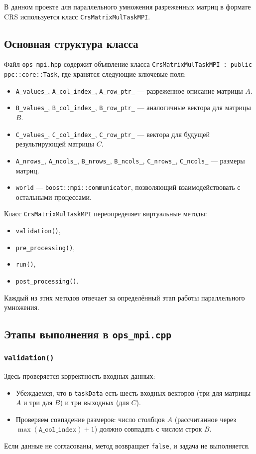 \documentclass[12pt]{article}
\begin{document}
В данном проекте для параллельного умножения разреженных матриц в формате CRS используется класс 
\texttt{CrsMatrixMulTaskMPI}.

\subsection{Основная структура класса}

Файл \texttt{ops\_mpi.hpp} содержит объявление класса 
\texttt{CrsMatrixMulTaskMPI : public ppc::core::Task}, где хранятся следующие ключевые поля:
\begin{itemize}
    \item \texttt{A\_values\_}, \texttt{A\_col\_index\_}, \texttt{A\_row\_ptr\_} --- разреженное описание матрицы \(A\).
    \item \texttt{B\_values\_}, \texttt{B\_col\_index\_}, \texttt{B\_row\_ptr\_} --- аналогичные вектора для матрицы \(B\).
    \item \texttt{C\_values\_}, \texttt{C\_col\_index\_}, \texttt{C\_row\_ptr\_} --- вектора для будущей результирующей матрицы \(C\).
    \item \texttt{A\_nrows\_}, \texttt{A\_ncols\_}, \texttt{B\_nrows\_}, \texttt{B\_ncols\_}, \texttt{C\_nrows\_}, \texttt{C\_ncols\_} --- размеры матриц.
    \item \texttt{world} --- \texttt{boost::mpi::communicator}, позволяющий взаимодействовать с остальными процессами.
\end{itemize}

Класс \texttt{CrsMatrixMulTaskMPI} переопределяет виртуальные методы:
\begin{itemize}
    \item \texttt{validation()},
    \item \texttt{pre\_processing()},
    \item \texttt{run()},
    \item \texttt{post\_processing()}.
\end{itemize}
Каждый из этих методов отвечает за определённый этап работы параллельного умножения.

\subsection{Этапы выполнения в \texttt{ops\_mpi.cpp}}

\subsubsection{\texttt{validation()}}
Здесь проверяется корректность входных данных:
\begin{itemize}
    \item Убеждаемся, что в \texttt{taskData} есть шесть входных векторов (три для матрицы \(A\) и три для \(B\)) и три выходных (для \(C\)).
    \item Проверяем совпадение размеров: число столбцов \(A\) (рассчитанное через \(\max(\texttt{A\_col\_index}) + 1\)) должно совпадать с числом строк \(B\).
\end{itemize}
Если данные не согласованы, метод возвращает \texttt{false}, и задача не выполняется.
\end{document}
